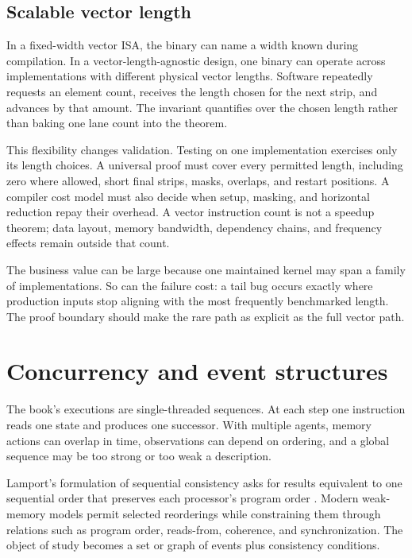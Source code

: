 \subsection{Scalable vector length}

In a fixed-width vector ISA, the binary can name a width known during
compilation. In a vector-length-agnostic design, one binary can operate across
implementations with different physical vector lengths. Software repeatedly
requests an element count, receives the length chosen for the next strip, and
advances by that amount. The invariant quantifies over the chosen length
rather than baking one lane count into the theorem.

This flexibility changes validation. Testing on one implementation exercises
only its length choices. A universal proof must cover every permitted length,
including zero where allowed, short final strips, masks, overlaps, and restart
positions. A compiler cost model must also decide when setup, masking, and
horizontal reduction repay their overhead. A vector instruction count is not
a speedup theorem; data layout, memory bandwidth, dependency chains, and
frequency effects remain outside that count.

The business value can be large because one maintained kernel may span a
family of implementations. So can the failure cost: a tail bug occurs exactly
where production inputs stop aligning with the most frequently benchmarked
length. The proof boundary should make the rare path as explicit as the full
vector path.

\section{Concurrency and event structures}

The book's executions are single-threaded sequences. At each step one
instruction reads one state and produces one successor. With multiple agents,
memory actions can overlap in time, observations can depend on ordering, and a
global sequence may be too strong or too weak a description.

Lamport's formulation of sequential consistency asks for results equivalent
to one sequential order that preserves each processor's program order
\autocite{lamport1979multiprocessor}. Modern weak-memory models permit selected
reorderings while constraining them through relations such as program order,
reads-from, coherence, and synchronization. The object of study becomes a set
or graph of events plus consistency conditions.

